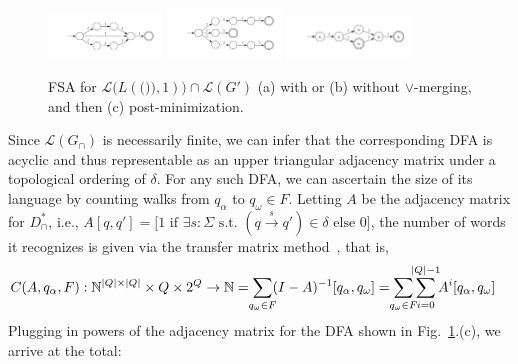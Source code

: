 \documentclass[sigplan,review,acmsmall,nonacm,screen,anonymous]{acmart}\settopmatter{printfolios=false,printccs=false,printacmref=false}
\begin{document}
\begin{figure}[H]
  \centering
  \includegraphics[width=0.27\textwidth]{figures/dyck_nfa}
  \includegraphics[width=0.27\textwidth]{figures/dyck_nfa_orig}
  \includegraphics[width=0.30\textwidth]{figures/dyck_dfa}
  \vspace{-0.2cm}
  \caption{FSA for $\mathcal{L}\big(L(\texttt{())}, 1)\big)\cap\mathcal{L}(G')$ (a) with or (b) without $\lor$-merging, and then (c) post-minimization.}\label{fig:fsas_for_re}
  \vspace{-0.2cm}
\end{figure}
Since $\mathcal{L}(G_\cap)$ is necessarily finite, we can infer that the corresponding DFA is acyclic and thus representable as an upper triangular adjacency matrix under a topological ordering of $\delta$. For any such DFA, we can ascertain the size of its language by counting walks from $q_\alpha$ to $q_\omega \in F$. Letting $A$ be the adjacency matrix for $D_\cap^*$, i.e., $A[q, q'] = \big[1 \text{ if } \exists s: \Sigma \text{ s.t. } (q \overset{s}{\rightarrow} q') \in \delta \text{ else } 0\big]$, the number of words it recognizes is given via the transfer matrix method~\cite{flajolet2009analytic}, that is,
\begin{align}
  C(A, q_\alpha, F): \mathbb{N}^{|Q|\times|Q|} \times Q \times 2^Q \rightarrow \mathbb{N} = \sum_{\mathclap{q_\omega \in F}}(I-A)^{-1}[q_\alpha, q_\omega] &= \sum_{\mathclap{q_\omega \in F}}\sum_{i = 0}^{\mathclap{|Q|-1}}A^i[q_\alpha, q_\omega]
\end{align}
\noindent Plugging in powers of the adjacency matrix for the DFA shown in Fig.~\ref{fig:fsas_for_re}.(c), we arrive at the total:
\end{document}
